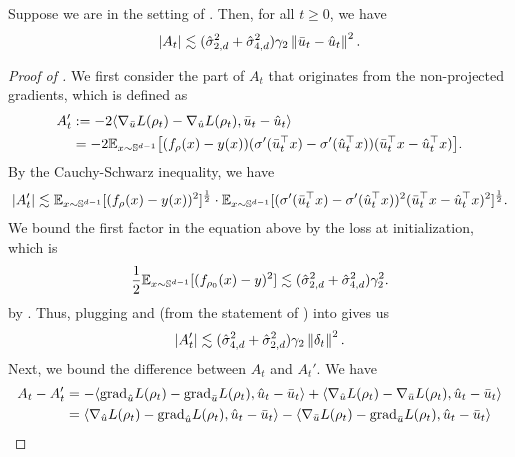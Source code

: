 \begin{lemma}\label{lemma:At_bound_later}
Suppose we are in the setting of . Then, for all $t \geq 0$, we have
    \begin{align}
        |A_t| \lesssim (\hat{\sigma}_{2, d}^2 + \hat{\sigma}_{4, d}^2)\gamma_2 \left\lVert\bar{u}_t-\hat{u}_t\right\rVert^2.    
    \end{align}
\end{lemma}
\begin{proof}[Proof of ]
    We first consider the part of $A_t$ that originates from the non-projected gradients, which is defined as
    \begin{align}
        A_t'  &:= -2\langle \nabla_{\bar{u}} L(\rho_t) - \nabla_{\hat{u}} L(\rho_t), \bar{u}_t-\hat{u}_t \rangle\\
        &= -2 \mathbb{E}_{x\sim\mathbb{S}^{d-1}} \big[ (f_\rho(x) - y(x))(\sigma'(\bar{u}_t^\top x) - \sigma'(\hat{u}_t^\top x))(\bar{u}_t^\top x  -\hat{u}_t^\top x) \big].
    \end{align}
    By the Cauchy-Schwarz inequality, we have
    \begin{align}
        |A_t'| \lesssim \mathbb{E}_{x\sim\mathbb{S}^{d-1}} [(f_\rho(x) - y(x))^2 ]^{\frac{1}{2}} \cdot \mathbb{E}_{x\sim\mathbb{S}^{d-1}} [(\sigma'(\bar{u}_t^\top x) - \sigma'(\hat{u}_t^\top x))^2(\bar{u}_t^\top x  -\hat{u}_t^\top x)^2]^{\frac{1}{2}}. \label{eq:at_6}
    \end{align}
    We bound the first factor in the equation above by the loss at initialization, which is
    \begin{align}
        \frac{1}{2} \mathbb{E}_{x\sim\mathbb{S}^{d-1}} [(f_{\rho_0}(x)-y)^2] \lesssim (\hat{\sigma}_{2, d}^2+\hat{\sigma}_{4, d}^2)\gamma_2^2. \label{eq:at_4}
    \end{align}
    by . Thus, plugging  and  (from the statement of ) into  gives us
    \begin{align}
        |A_t'| \lesssim (\hat{\sigma}_{4, d}^2 + \hat{\sigma}_{2, d}^2) \gamma_2\left\lVert\delta_t\right\rVert^2.\label{eq:at_9}
    \end{align}
    Next, we bound the difference between $A_t$ and $A_t'$. We have
    \begin{align}
    A_t - A_t'
    & = - \langle \pgrad_{\uhat} L(\rho_t) - \pgrad_{\ubar} L(\rho_t), \uhat_t - \ubar_t \rangle + \langle \nabla_{\uhat} L(\rho_t) - \nabla_{\ubar} L(\rho_t), \uhat_t - \ubar_t \rangle \\
    & = \langle \nabla_{\uhat} L(\rho_t) - \pgrad_{\uhat} L(\rho_t), \uhat_t - \ubar_t \rangle - \langle \nabla_{\ubar} L(\rho_t) - \pgrad_{\ubar} L(\rho_t), \uhat_t - \ubar_t \rangle \label{eq:projected_diff_At}

\end{align}
\end{proof}
